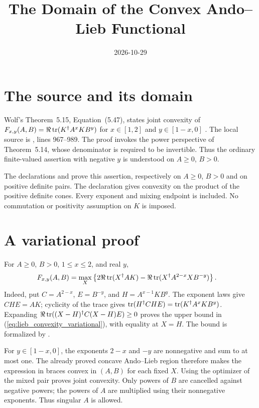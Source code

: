 \documentclass{article}
\title{The Domain of the Convex Ando--Lieb Functional}
\author{}
\date{2026-10-29}
\begin{document}
\maketitle
{}

\section{The source and its domain}

Wolf's Theorem~5.15, Equation~(5.47), states joint convexity of
$F_{x,y}(A,B)=\Re\operatorname{tr}(K^\dagger A^xKB^y)$ for $x\in[1,2]$ and
$y\in[1-x,0]$ \cite{Wolf2012Quantum}. The local source is
, lines 967--989.
The proof invokes the power perspective of Theorem~5.14, whose denominator
is required to be invertible. Thus the ordinary finite-valued assertion with
negative $y$ is understood on $A\geq0$, $B>0$.

The declarations  and
 prove this assertion, respectively on
$A\geq0$, $B>0$ and on positive definite pairs. The declaration
 gives convexity on the product
of the positive definite cones. Every exponent and mixing endpoint is included.
No commutation or positivity assumption on $K$ is imposed.

\section{A variational proof}

For $A\geq0$, $B>0$, $1\leq x\leq2$, and real $y$,
\begin{align}
 F_{x,y}(A,B)
 &=\max_X\left\{2\Re\operatorname{tr}(X^\dagger AK)
       -\Re\operatorname{tr}(X^\dagger A^{2-x}XB^{-y})\right\}.
 \label{eq:lieb_convexity_variational}
\end{align}
Indeed, put $C=A^{2-x}$, $E=B^{-y}$, and $H=A^{x-1}KB^y$.
The exponent laws give $CHE=AK$; cyclicity of the trace gives
$\operatorname{tr}(H^\dagger CHE)=\operatorname{tr}(K^\dagger A^xKB^y)$.
Expanding $\Re\operatorname{tr}((X-H)^\dagger C(X-H)E)\geq0$ proves the upper bound
in (\ref{eq:lieb_convexity_variational}), with equality at $X=H$.
The bound is formalized by .

For $y\in[1-x,0]$, the exponents $2-x$ and $-y$ are nonnegative and sum
to at most one. The already proved concave Ando--Lieb region therefore makes
the expression in braces convex in $(A,B)$ for each fixed $X$.
Using the optimizer of the mixed pair proves joint convexity.
Only powers of $B$ are cancelled against negative powers; the powers of $A$
are multiplied using their nonnegative exponents. Thus singular $A$ is allowed.
\end{document}
